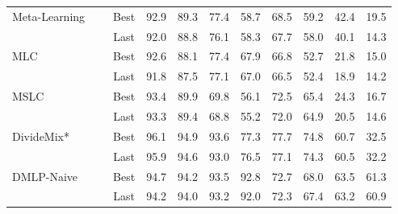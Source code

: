\documentclass[10pt,twocolumn,letterpaper]{article}
\newcommand{\red}[1]{{#1}}
\begin{document}
\begin{table*}[!t]
{\begin{tabular}{l c c |c|c|c|c||c|c|c|c}
        \multirow{2}{*}{Meta-Learning~\cite{MLNT}}      &                     & Best & 92.9             &     89.3      &     77.4      &     58.7      &       68.5       &       59.2       &     42.4      &     19.5      \\
                                                        &               \red{\multirow{-2}{*}{\CheckmarkBold} }         & Last & 92.0             &     88.8      &     76.1      &     58.3      &       67.7       &       58.0       &     40.1      &     14.3      \\ \midrule
        \multirow{2}{*}{MLC~\cite{zheng2021meta}} & & Best &   92.6        &   88.1        &  77.4         & 67.9        &   66.8           &   52.7           &  21.8        &  15.0         \\
                             &\red{\multirow{-2}{*}{\CheckmarkBold}}  & Last &  91.8         & 87.5      & 77.1         &  67.0       & 66.5            &  52.4         &  18.9         &  14.2        \\ \midrule
        \multirow{2}{*}{MSLC~\cite{AAAI-2021-meta}} & &Best & 93.4     & 89.9         & 69.8       &  56.1        &   72.5           &  65.4           &   24.3        & 16.7         \\
             & \red{\multirow{-2}{*}{\CheckmarkBold}}&Last & 93.3     & 89.4         & 68.8       &  55.2          & 72.0          &   64.9           &  20.5         & 14.6          \\ \midrule


        \multirow{2}{*}{DivideMix{*}~\cite{li2020dividemix}} & & Best &   96.1        &   94.9        &          93.6 &77.3         &     77.7         &   74.8           &60.7          &32.5           \\
                             &\red{\multirow{-2}{*}{\CheckmarkBold}}  & Last & 95.9          & 94.6      &  93.0        & 76.5        &77.1             &  74.3         &  60.5         &  32.2        \\

                    \midrule \midrule
\multirow{2}{*}{DMLP-Naive}                           &  & Best & 94.7 & 94.2 & 93.5 &  92.8 &72.7 & 68.0 & 63.5 & 61.3  \\  
        &   \red{ \multirow{-2}{*}{\CheckmarkBold}}          & Last & 94.2 & 94.0 & 93.2 & 92.0 & 72.3 & 67.4 & 63.2 & 60.9 \\ \midrule                                                           
                                                                    

\end{tabular}}
\end{table*}
\end{document}
